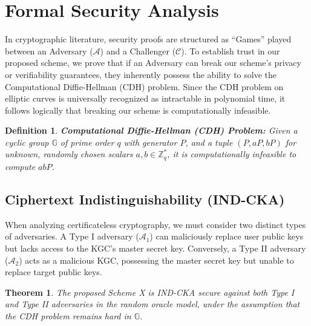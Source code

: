 \documentclass[10pt,journal,compsoc]{IEEEtran}
\newtheorem{theorem}{Theorem}
\newtheorem{definition}{Definition}
\begin{document}
\section{Formal Security Analysis}\label{sec:security}
In cryptographic literature, security proofs are structured as ``Games'' played between an Adversary ($\mathcal{A}$) and a Challenger ($\mathcal{C}$). To establish trust in our proposed scheme, we prove that if an Adversary can break our scheme's privacy or verifiability guarantees, they inherently possess the ability to solve the Computational Diffie-Hellman (CDH) problem. Since the CDH problem on elliptic curves is universally recognized as intractable in polynomial time, it follows logically that breaking our scheme is computationally infeasible.

\begin{definition}
\textbf{Computational Diffie-Hellman (CDH) Problem:} Given a cyclic group $\mathbb{G}$ of prime order $q$ with generator $P$, and a tuple $(P, aP, bP)$ for unknown, randomly chosen scalars $a, b \in \mathbb{Z}_q^*$, it is computationally infeasible to compute $abP$.
\end{definition}

\subsection{Ciphertext Indistinguishability (IND-CKA)}
When analyzing certificateless cryptography, we must consider two distinct types of adversaries. A Type I adversary ($\mathcal{A}_1$) can maliciously replace user public keys but lacks access to the KGC's master secret key. Conversely, a Type II adversary ($\mathcal{A}_2$) acts as a malicious KGC, possessing the master secret key but unable to replace target public keys.

\begin{theorem}
The proposed Scheme X is IND-CKA secure against both Type I and Type II adversaries in the random oracle model, under the assumption that the CDH problem remains hard in $\mathbb{G}$.
\end{theorem}
\end{document}
